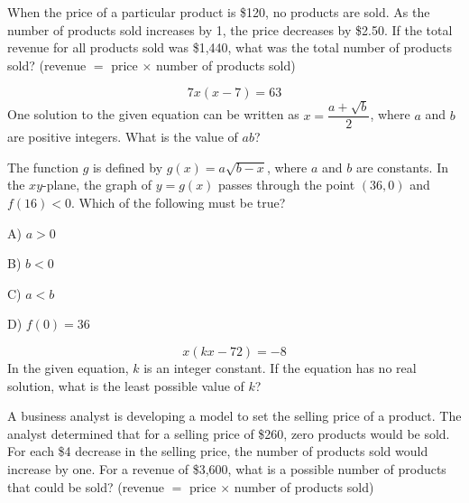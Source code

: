 \vfill
\clearpage
\noindent\begin{minipage}{\linewidth}
\par\smallskip
When the price of a particular product is \$120, no products are sold. As the number of products sold increases by 1, the price decreases by \$2.50. If the total revenue for all products sold was \$1,440, what was the total number of products sold? (revenue $=$ price $\times$ number of products sold)
\end{minipage}
\vfill
\noindent\begin{minipage}{\linewidth}
\par\smallskip
$$7x(x-7)=63$$ One solution to the given equation can be written as $x=\dfrac{a+\sqrt{b}}{2}$, where $a$ and $b$ are positive integers. What is the value of $ab$?
\end{minipage}
\vfill
\noindent\begin{minipage}{\linewidth}
\par\smallskip
The function $g$ is defined by $g(x)=a\sqrt{b-x}$, where $a$ and $b$ are constants. In the $xy$-plane, the graph of $y=g(x)$ passes through the point $(36,0)$ and $f(16)<0$. Which of the following must be true?
\begin{satchoices}
  \item[A)] $a>0$
  \item[B)] $b<0$
  \item[C)] $a<b$
  \item[D)] $f(0)=36$
\end{satchoices}
\end{minipage}
\vfill
\clearpage
\noindent\begin{minipage}{\linewidth}
\par\smallskip
$$x(kx-72)=-8$$ In the given equation, $k$ is an integer constant. If the equation has no real solution, what is the least possible value of $k$?
\end{minipage}
\vfill
\noindent\begin{minipage}{\linewidth}
\par\smallskip
A business analyst is developing a model to set the selling price of a product. The analyst determined that for a selling price of \$260, zero products would be sold. For each \$4 decrease in the selling price, the number of products sold would increase by one. For a revenue of \$3,600, what is a possible number of products that could be sold? (revenue $=$ price $\times$ number of products sold)
\end{minipage}
